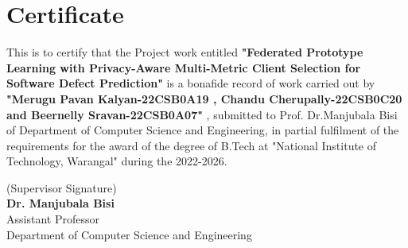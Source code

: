 \chapter*{Certificate}

This is to certify that the Project work entitled \textbf{"Federated Prototype Learning with Privacy-Aware Multi-Metric Client Selection for Software Defect Prediction"} is a bonafide
record of work carried out by \textbf{"Merugu Pavan Kalyan-22CSB0A19 , Chandu Cherupally-22CSB0C20 and Beernelly Sravan-22CSB0A07"} , submitted to {Prof. Dr.Manjubala Bisi} of Department of Computer Science and Engineering, in partial fulfilment of the requirements for the award of the degree
of B.Tech at "National Institute of Technology,
Warangal" during the 2022-2026.
\vspace{8em}
\begin {flushright}
 (Supervisor Signature)\\
\textbf{Dr. Manjubala Bisi}\\
{Assistant Professor}\\
Department of Computer Science and Engineering
\end{flushright}

\vspace{5em}

